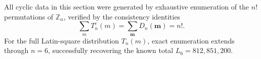 \documentclass[11pt,a4paper]{amsart}
\newtheorem{remark}[theorem]{Remark}
\newcommand{\1}{\mathbf{1}}
\begin{document}
%
%
%
%
%
%
%
%

All cyclic data in this section were generated by exhaustive enumeration of the $n!$ permutations of $\mathbb{Z}_n$, verified by the consistency identities
\[
\sum_m T_n^c(m) = \sum_{\mathbf{m}} D_n(\mathbf{m}) = n!.
\]
For the full Latin-square distribution $T_n(m)$, exact enumeration extends through $n=6$, successfully recovering the known total $L_6 = 812{,}851{,}200$.
\end{document}
